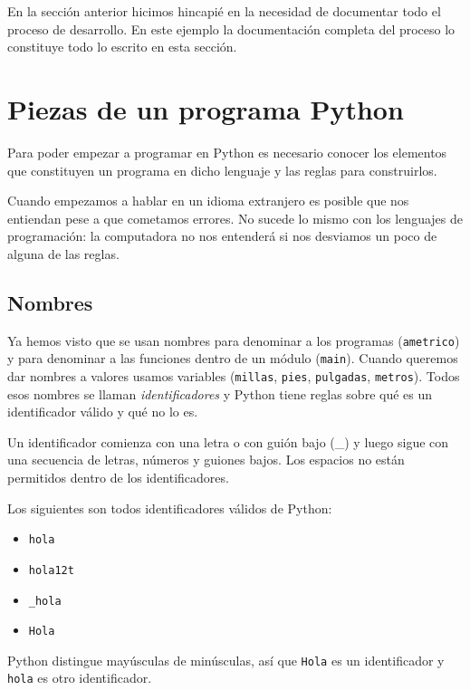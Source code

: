 En la sección anterior hicimos hincapié en la necesidad de
documentar todo el proceso de desarrollo. En este ejemplo la
documentación completa del proceso lo constituye todo lo escrito
en esta sección.

\section {Piezas de un programa Python}
Para poder empezar a programar en Python es necesario conocer los elementos
que constituyen un programa en dicho lenguaje y las reglas para construirlos.

\begin{observacion}
Cuando empezamos a hablar en un idioma extranjero es posible que nos entiendan
pese a que cometamos errores. No sucede lo mismo con los lenguajes de
programación: la computadora no nos entenderá si nos desviamos un poco de
alguna de las reglas.
\end{observacion}

\subsection{Nombres}
Ya hemos visto que se usan nombres para denominar a los programas
(\lstinline!ametrico!) y para denominar a las funciones dentro de un
módulo (\lstinline!main!). Cuando queremos dar nombres a valores usamos
variables (\lstinline!millas!, \lstinline!pies!, \lstinline!pulgadas!,
\lstinline!metros!). Todos esos nombres se llaman {\it identificadores}
y Python tiene reglas sobre qué es un identificador válido y qué
no lo es.

Un identificador comienza con una letra o con guión bajo (\_) y
luego sigue con una secuencia de letras, números y guiones bajos.
Los espacios no están permitidos dentro de los identificadores.

Los siguientes son todos identificadores válidos de Python:

\begin{itemize}
\item \lstinline!hola!
\item \lstinline!hola12t!
\item \lstinline!_hola!
\item \lstinline!Hola!
\end{itemize}

Python distingue mayúsculas de minúsculas, así que \lstinline!Hola! es
un identificador y \lstinline!hola! es otro identificador.

